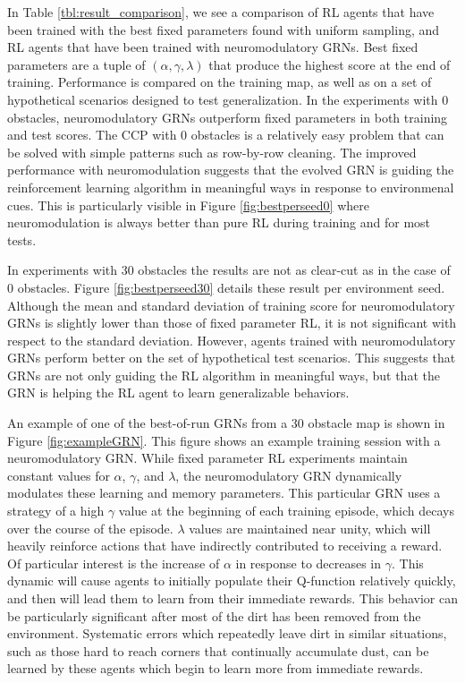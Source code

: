 \documentclass[conference]{IEEEtran}
\begin{document}
In Table \ref{tbl:result_comparison}, we see a comparison of RL agents that have
been trained with the best fixed parameters found with uniform sampling, and RL
agents that have been trained with neuromodulatory GRNs. Best fixed parameters
are a tuple of $(\alpha,\gamma,\lambda)$ that produce the highest score at the end
of training. Performance is compared
on the training map, as well as on a set of hypothetical scenarios designed to
test generalization. In the experiments with 0 obstacles, neuromodulatory GRNs
outperform fixed parameters in both training and test scores. The CCP with 0
obstacles is a relatively easy problem that can be solved with simple patterns
such as row-by-row cleaning. The improved performance with neuromodulation suggests
that the evolved GRN is guiding the reinforcement learning algorithm in meaningful
ways in response to environmenal cues. This is particularly visible in Figure
\ref{fig:bestperseed0} where neuromodulation is always better than pure
RL during training and for most tests. 

In experiments with 30 obstacles the results are not as clear-cut as in the case
of 0 obstacles. Figure \ref{fig:bestperseed30} details these result per
environment seed. Although the mean and standard deviation of training score for
neuromodulatory GRNs is slightly lower than those of fixed parameter RL, it is
not significant with respect to the standard deviation. However, agents trained
with neuromodulatory GRNs perform better on the set of hypothetical test scenarios.
This suggests that GRNs are not only guiding the RL algorithm in meaningful ways,
but that the GRN is helping the RL agent to learn generalizable behaviors. 

An example of one of the best-of-run GRNs from a 30 obstacle map is shown in
Figure \ref{fig:exampleGRN}. This figure shows an example training session with
a neuromodulatory GRN. While fixed parameter RL experiments maintain constant values
for $\alpha$, $\gamma$, and $\lambda$, the neuromodulatory GRN dynamically modulates
these learning and memory parameters. This particular GRN uses a strategy of a
high $\gamma$ value at the beginning of each training episode, which decays over the
course of the episode. $\lambda$ values are maintained near unity, which will 
heavily reinforce actions that have indirectly contributed to receiving a reward. Of
particular interest is the increase of $\alpha$ in response to decreases in $\gamma$.
This dynamic will cause agents to initially populate their Q-function relatively
quickly, and then will lead them to learn from their immediate rewards. This 
behavior can be particularly significant after most of the dirt has been removed
from the environment. Systematic errors which repeatedly leave dirt in similar
situations, such as those hard to reach corners that continually accumulate dust,
can be learned by these agents which begin to learn more from immediate rewards.
\end{document}
